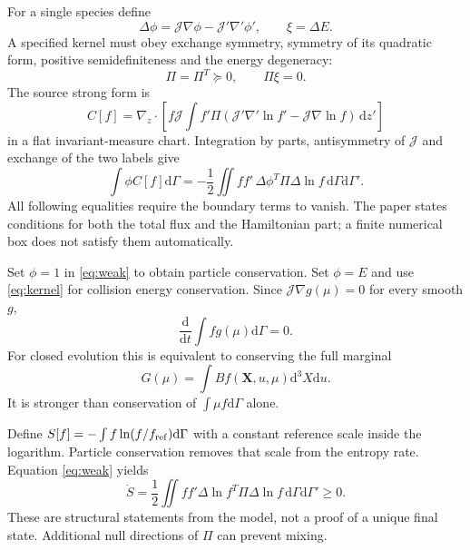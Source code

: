 \documentclass[11pt,letterpaper]{article}
\newcommand{\J}{\mathcal J}
\newcommand{\dd}{\mathrm d}
\newcommand{\X}{\mathbf X}
\begin{document}
For a single species define
\begin{equation}
 \Delta\phi=\J\nabla\phi-\J'\nabla'\phi',\qquad \xi=\Delta E.
 \label{eq:delta}
\end{equation}
A specified kernel must obey exchange symmetry, symmetry of its quadratic form,
positive semidefiniteness and the energy degeneracy:
\begin{equation}
 \Pi=\Pi^T\succeq0,\qquad \Pi\xi=0.
 \label{eq:kernel}
\end{equation}
The source strong form is
\begin{equation}
 C[f]=\nabla_z\cdot\left[
 f\J\int f'\Pi(\J'\nabla'\ln f'-\J\nabla\ln f)\,\dd z'\right]
 \label{eq:strong}
\end{equation}
in a flat invariant-measure chart. Integration by parts, antisymmetry of $\J$
and exchange of the two labels give
\begin{equation}
 \int\phi C[f]\dd\Gamma
 =-\frac12\iint ff'\,\Delta\phi^T\Pi\Delta\ln f\,
 \dd\Gamma\dd\Gamma'.
 \label{eq:weak}
\end{equation}
All following equalities require the boundary terms to vanish. The paper states
conditions for both the total flux and the Hamiltonian part; a finite numerical
box does not satisfy them automatically.

Set $\phi=1$ in \eqref{eq:weak} to obtain particle conservation. Set $\phi=E$
and use \eqref{eq:kernel} for collision energy conservation. Since
$\J\nabla g(\mu)=0$ for every smooth $g$,
\begin{equation}
 \frac{\dd}{\dd t}\int f g(\mu)\dd\Gamma=0.
 \label{eq:casimirs}
\end{equation}
For closed evolution this is equivalent to conserving the full marginal
\begin{equation}
 G(\mu)=\int B f(\X,u,\mu)\dd^3X\dd u.
 \label{eq:marginal}
\end{equation}
It is stronger than conservation of $\int\mu f\dd\Gamma$ alone.

Define $S[f]=-\int f\ln(f/f_{\rm ref})\dd\Gamma$ with a constant reference
scale inside the logarithm. Particle conservation removes that scale from the
entropy rate. Equation \eqref{eq:weak} yields
\begin{equation}
 \dot S=\frac12\iint ff'\Delta\ln f^T\Pi\Delta\ln f\,
 \dd\Gamma\dd\Gamma'\ge0.
 \label{eq:entropy}
\end{equation}
These are structural statements from the model, not a proof of a unique final
state. Additional null directions of $\Pi$ can prevent mixing.
\end{document}
